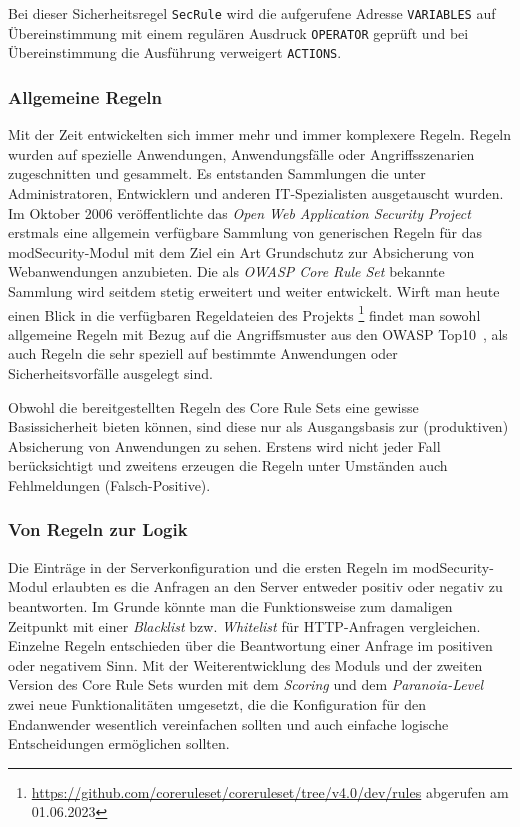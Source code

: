 Bei dieser Sicherheitsregel \verb=SecRule= wird die aufgerufene Adresse \verb=VARIABLES= auf Übereinstimmung mit einem regulären Ausdruck \verb=OPERATOR= geprüft und bei Übereinstimmung die Ausführung verweigert \verb=ACTIONS=.

\subsubsection{Allgemeine Regeln}
Mit der Zeit entwickelten sich immer mehr und immer komplexere Regeln. Regeln wurden auf spezielle Anwendungen, Anwendungsfälle oder Angriffsszenarien zugeschnitten und gesammelt. Es entstanden Sammlungen die unter Administratoren, Entwicklern und anderen IT-Spezialisten ausgetauscht wurden.
Im Oktober 2006 veröffentlichte das \emph{Open Web Application Security Project} erstmals eine allgemein verfügbare Sammlung von generischen Regeln für das modSecurity-Modul mit dem Ziel ein Art Grundschutz zur Absicherung von Webanwendungen anzubieten. Die als \emph{OWASP Core Rule Set} bekannte Sammlung wird seitdem stetig erweitert und weiter entwickelt. Wirft man heute einen Blick in die verfügbaren Regeldateien des Projekts \footnote{\url{https://github.com/coreruleset/coreruleset/tree/v4.0/dev/rules} abgerufen am 01.06.2023} findet man sowohl allgemeine Regeln mit Bezug auf die Angriffsmuster aus den OWASP Top10~\cite{owasp10}, als auch Regeln die sehr speziell auf bestimmte Anwendungen oder Sicherheitsvorfälle ausgelegt sind.

Obwohl die bereitgestellten Regeln des Core Rule Sets eine gewisse Basissicherheit bieten können, sind diese nur als Ausgangsbasis zur (produktiven) Absicherung von Anwendungen zu sehen. Erstens wird nicht jeder Fall berücksichtigt und zweitens erzeugen die Regeln unter Umständen auch Fehlmeldungen (Falsch-Positive).

\subsubsection{Von Regeln zur Logik}
Die Einträge in der Serverkonfiguration und die ersten Regeln im modSecurity-Modul erlaubten es die Anfragen an den Server entweder positiv oder negativ zu beantworten. Im Grunde könnte man die Funktionsweise zum damaligen Zeitpunkt mit einer \emph{Blacklist} bzw. \emph{Whitelist} für HTTP-Anfragen vergleichen. Einzelne Regeln entschieden über die Beantwortung einer Anfrage im positiven oder negativem Sinn. Mit der Weiterentwicklung des Moduls und der zweiten Version des Core Rule Sets wurden mit dem \emph{Scoring} und dem \emph{Paranoia-Level} zwei neue Funktionalitäten umgesetzt, die die Konfiguration für den Endanwender wesentlich vereinfachen sollten und auch einfache logische Entscheidungen ermöglichen sollten.\\

